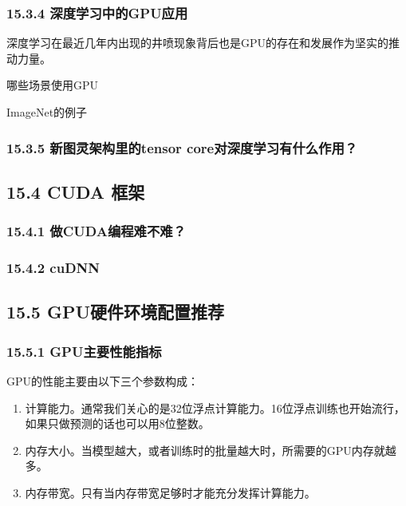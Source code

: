 \subsubsection{15.3.4
深度学习中的GPU应用}\label{ux6df1ux5ea6ux5b66ux4e60ux4e2dux7684gpuux5e94ux7528}

深度学习在最近几年内出现的井喷现象背后也是GPU的存在和发展作为坚实的推动力量。

哪些场景使用GPU

ImageNet的例子

\subsubsection{15.3.5 新图灵架构里的tensor
core对深度学习有什么作用？}\label{ux65b0ux56feux7075ux67b6ux6784ux91ccux7684tensor-coreux5bf9ux6df1ux5ea6ux5b66ux4e60ux6709ux4ec0ux4e48ux4f5cux7528}

\subsection{15.4 CUDA 框架}\label{cuda-ux6846ux67b6}

\subsubsection{15.4.1
做CUDA编程难不难？}\label{ux505acudaux7f16ux7a0bux96beux4e0dux96be}

\subsubsection{15.4.2 cuDNN}\label{cudnn}

\subsection{15.5
GPU硬件环境配置推荐}\label{gpuux786cux4ef6ux73afux5883ux914dux7f6eux63a8ux8350}

\subsubsection{15.5.1
GPU主要性能指标}\label{gpuux4e3bux8981ux6027ux80fdux6307ux6807}

GPU的性能主要由以下三个参数构成：

\begin{enumerate}
\def\labelenumi{\arabic{enumi}.}
\item
  计算能力。通常我们关心的是32位浮点计算能力。16位浮点训练也开始流行，如果只做预测的话也可以用8位整数。
\item
  内存大小。当模型越大，或者训练时的批量越大时，所需要的GPU内存就越多。
\item
  内存带宽。只有当内存带宽足够时才能充分发挥计算能力。
\end{enumerate}

